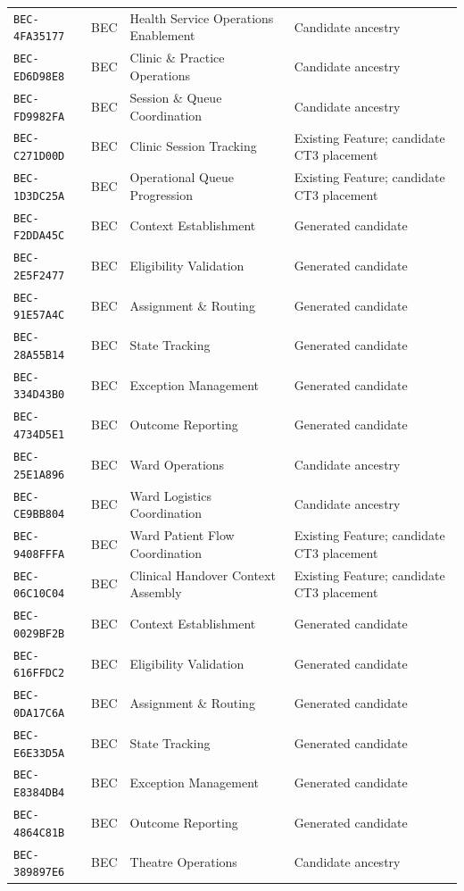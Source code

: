 \documentclass[11pt,a4paper,openany]{book}
\begin{document}
\begin{longtable}{@{}p{.19\linewidth}p{.12\linewidth}p{.39\linewidth}p{.24\linewidth}@{}}
\texttt{BEC-4FA35177} & BEC & Health Service Operations Enablement & Candidate ancestry \\
\texttt{BEC-ED6D98E8} & BEC & Clinic \& Practice Operations & Candidate ancestry \\
\texttt{BEC-FD9982FA} & BEC & Session \& Queue Coordination & Candidate ancestry \\
\texttt{BEC-C271D00D} & BEC & Clinic Session Tracking & Existing Feature; candidate CT3 placement \\
\texttt{BEC-1D3DC25A} & BEC & Operational Queue Progression & Existing Feature; candidate CT3 placement \\
\texttt{BEC-F2DDA45C} & BEC & Context Establishment & Generated candidate \\
\texttt{BEC-2E5F2477} & BEC & Eligibility Validation & Generated candidate \\
\texttt{BEC-91E57A4C} & BEC & Assignment \& Routing & Generated candidate \\
\texttt{BEC-28A55B14} & BEC & State Tracking & Generated candidate \\
\texttt{BEC-334D43B0} & BEC & Exception Management & Generated candidate \\
\texttt{BEC-4734D5E1} & BEC & Outcome Reporting & Generated candidate \\
\texttt{BEC-25E1A896} & BEC & Ward Operations & Candidate ancestry \\
\texttt{BEC-CE9BB804} & BEC & Ward Logistics Coordination & Candidate ancestry \\
\texttt{BEC-9408FFFA} & BEC & Ward Patient Flow Coordination & Existing Feature; candidate CT3 placement \\
\texttt{BEC-06C10C04} & BEC & Clinical Handover Context Assembly & Existing Feature; candidate CT3 placement \\
\texttt{BEC-0029BF2B} & BEC & Context Establishment & Generated candidate \\
\texttt{BEC-616FFDC2} & BEC & Eligibility Validation & Generated candidate \\
\texttt{BEC-0DA17C6A} & BEC & Assignment \& Routing & Generated candidate \\
\texttt{BEC-E6E33D5A} & BEC & State Tracking & Generated candidate \\
\texttt{BEC-E8384DB4} & BEC & Exception Management & Generated candidate \\
\texttt{BEC-4864C81B} & BEC & Outcome Reporting & Generated candidate \\
\texttt{BEC-389897E6} & BEC & Theatre Operations & Candidate ancestry \\

\end{longtable}
\end{document}
